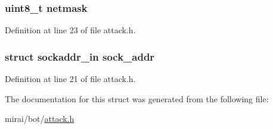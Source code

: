 \subsubsection[{\texorpdfstring{netmask}{netmask}}]{\setlength{\rightskip}{0pt plus 5cm}uint8\+\_\+t netmask}\hypertarget{structattack__target_aa42d0389fa417fb1afc191722982311f}{}\label{structattack__target_aa42d0389fa417fb1afc191722982311f}


Definition at line 23 of file attack.\+h.

\subsubsection[{\texorpdfstring{sock\+\_\+addr}{sock_addr}}]{\setlength{\rightskip}{0pt plus 5cm}struct sockaddr\+\_\+in sock\+\_\+addr}\hypertarget{structattack__target_a2c92e670338226b0409a366df2dc53da}{}\label{structattack__target_a2c92e670338226b0409a366df2dc53da}


Definition at line 21 of file attack.\+h.



The documentation for this struct was generated from the following file\+:\begin{DoxyCompactItemize}
\item 
mirai/bot/\hyperlink{attack_8h}{attack.\+h}\end{DoxyCompactItemize}
